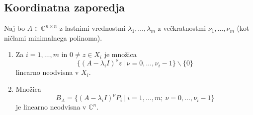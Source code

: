 \documentclass[mat1]{fmfdelo}
\newcommand{\C}{\mathbb C}
\begin{document}
\subsection{Koordinatna zaporedja}
\begin{lema}\label{lemaNeodvisnost}
    Naj bo $A \in \C^{n \times n}$ z lastnimi vrednostmi $\lambda_1, \ldots, \lambda_m$ z  večkratnostmi $\nu_1, \ldots, \nu_m$ (kot ničlami minimalnega polinoma).
    \begin{enumerate}
        \item Za $i = 1, \ldots, m$ in $0\neq z \in X_i$ je množica
                 \begin{equation*}
                     \{(A-\lambda_i I)^{\nu} z\ |\ \nu = 0, \ldots, \nu_i - 1\} \backslash \{0\}
                 \end{equation*}
                linearno neodvisna v $X_i$.
        \item Množica
                 \begin{equation*}
                     B_A = \{(A-\lambda_i I)^{\nu} P_i\ |\ i = 1, \ldots, m;\ \nu = 0, \ldots, \nu_i - 1\}
                 \end{equation*}
                je linearno neodvisna v $\C^n$.
    \end{enumerate}
\end{lema}
\end{document}
